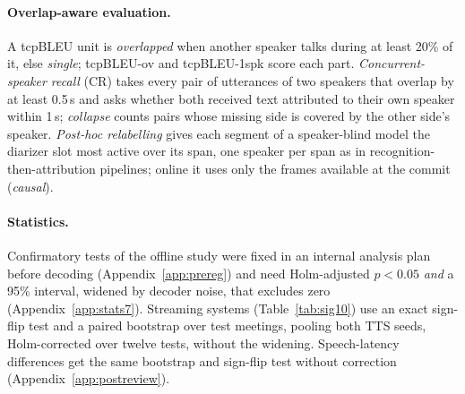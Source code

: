 \paragraph{Overlap-aware evaluation.}
\label{sec:eval-overlap}
A tcpBLEU unit is \emph{overlapped} when another speaker talks during at least 20\% of it, else \emph{single};
tcpBLEU-ov and tcpBLEU-1spk score each part. \emph{Concurrent-speaker recall} (CR) takes every pair of utterances of two
speakers that overlap by at least 0.5\,s and asks whether both received text attributed to their own speaker within
1\,s; \emph{collapse} counts pairs whose missing side is covered by the other side's speaker. \emph{Post-hoc relabelling}
gives each segment of a speaker-blind model the diarizer slot most active over its span, one speaker per span as in
recognition-then-attribution pipelines; online it uses only the frames available at the commit (\emph{causal}).

\paragraph{Statistics.} Confirmatory tests of the offline study were fixed in an internal analysis plan before
decoding (Appendix~\ref{app:prereg}) and need Holm-adjusted $p<0.05$ \emph{and} a 95\% interval, widened by decoder
noise, that excludes zero (Appendix~\ref{app:stats7}). Streaming systems (Table~\ref{tab:sig10}) use an exact sign-flip
test and a paired bootstrap over test meetings, pooling both TTS seeds, Holm-corrected over twelve tests, without the
widening. Speech-latency differences get the same bootstrap and sign-flip test without correction
(Appendix~\ref{app:postreview}).

